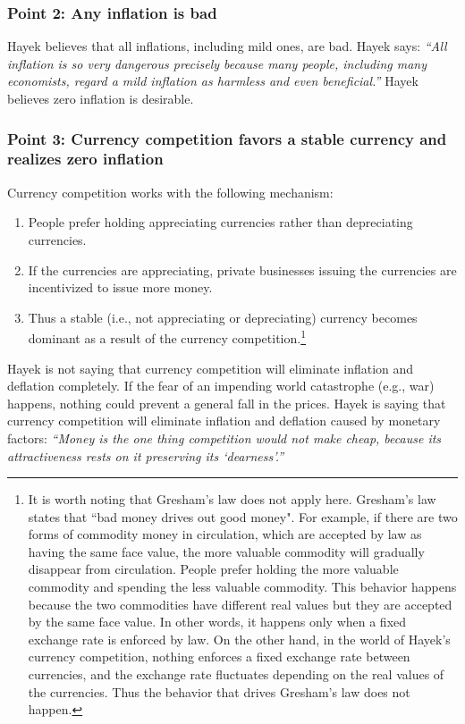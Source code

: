 \documentclass[dvipdfmx,a4paper]{article}
\begin{document}
\subsubsection{Point 2: Any inflation is bad}

Hayek believes that all inflations, including mild ones, are bad. Hayek says: \textit{``All inflation is so very dangerous precisely because many people, including many economists, regard a mild inflation as harmless and even beneficial.''} Hayek believes zero inflation is desirable.

\subsubsection{Point 3: Currency competition favors a stable currency and realizes zero inflation}

Currency competition works with the following mechanism:

\begin{enumerate}
\item People prefer holding appreciating currencies rather than depreciating currencies.
\item If the currencies are appreciating, private businesses issuing the currencies are incentivized to issue more money.
\item Thus a stable (i.e., not appreciating or depreciating) currency becomes dominant as a result of the currency competition.\footnote{It is worth noting that Gresham's law does not apply here. Gresham's law states that “bad money drives out good money". For example, if there are two forms of commodity money in circulation, which are accepted by law as having the same face value, the more valuable commodity will gradually disappear from circulation. People prefer holding the more valuable commodity and spending the less valuable commodity. This behavior happens because the two commodities have different real values but they are accepted by the same face value. In other words, it happens only when a fixed exchange rate is enforced by law. On the other hand, in the world of Hayek's currency competition, nothing enforces a fixed exchange rate between currencies, and the exchange rate fluctuates depending on the real values of the currencies. Thus the behavior that drives Gresham's law does not happen.}
\end{enumerate}

Hayek is not saying that currency competition will eliminate inflation and deflation completely. If the fear of an impending world catastrophe (e.g., war) happens, nothing could prevent a general fall in the prices. Hayek is saying that currency competition will eliminate inflation and deflation caused by monetary factors: \textit{``Money is the one thing competition would not make cheap, because its attractiveness rests on it preserving its `dearness'.''}
\end{document}
